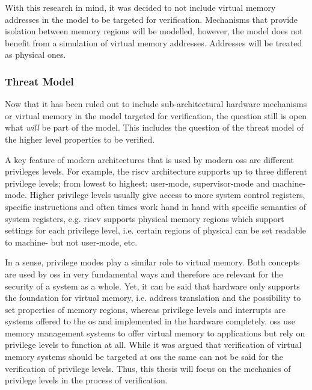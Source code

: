 With this research in mind, it was decided to not include virtual memory addresses in the model to be targeted for verification.
Mechanisms that provide isolation between memory regions will be modelled, however, the model does not benefit from a simulation of virtual memory addresses.
Addresses will be treated as physical ones.

\subsubsection{Threat Model}
\label{sec:threat-model}


Now that it has been ruled out to include sub-architectural hardware mechanisms or virtual memory in the model targeted for verification, the question still is open what \textit{will} be part of the model.
This includes the question of the threat model of the higher level properties to be verified.

A key feature of modern architectures that is used by modern \glspl{os} are different privileges levels.
For example, the \gls{riscv} architecture supports up to three different privilege levels; from lowest to highest: user-mode, supervisor-mode and machine-mode.
Higher privilege levels usually give access to more system control registers, specific instructions and often times work hand in hand with specific semantics of system registers, e.g. \gls{riscv} supports physical memory regions which support settings for each privilege level, i.e. certain regions of physical can be set readable to machine- but not user-mode, etc.

In a sense, privilege modes play a similar role to virtual memory.
Both concepts are used by \glspl{os} in very fundamental ways and therefore are relevant for the security of a system as a whole.
Yet, it can be said that hardware only supports the foundation for virtual memory, i.e. address translation and the possibility to set properties of memory regions, whereas privilege levels and interrupts are systems offered to the \gls{os} and implemented in the hardware completely.
\glspl{os} use memory management systems to offer virtual memory to applications but rely on privilege levels to function at all.
While it was argued that verification of virtual memory systems should be targeted at \glspl{os} the same can not be said for the verification of privilege levels.
Thus, this thesis will focus on the mechanics of privilege levels in the process of verification.

